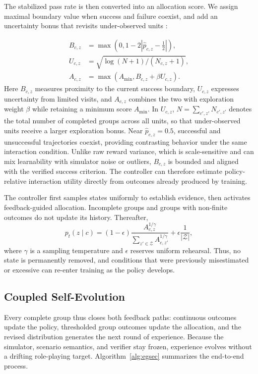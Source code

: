 \documentclass[letterpaper]{article}
\begin{document}
The stabilized pass rate is then converted into an allocation score. We assign maximal boundary value when success and failure coexist, and add an uncertainty bonus that revisits under-observed units \cite{auer2002ucb}:

\begin{equation}
\begin{aligned}
B_{c,z}&=\max(0,1-2|\hat p_{c,z}-\tfrac12|),\\
U_{c,z}&=\sqrt{\log(N+1)/(N_{c,z}+1)},\\
A_{c,z}&=\max(A_{\min},B_{c,z}+\beta U_{c,z}).
\end{aligned}
\label{eq:boundary}
\end{equation}
Here $B_{c,z}$ measures proximity to the current success boundary, $U_{c,z}$ expresses uncertainty from limited visits, and $A_{c,z}$ combines the two with exploration weight $\beta$ while retaining a minimum score $A_{\min}$. In $U_{c,z}$, $N=\sum_{c',z'}N_{c',z'}$ denotes the total number of completed groups across all units, so that under-observed units receive a larger exploration bonus. Near $\hat p_{c,z}=0.5$, successful and unsuccessful trajectories coexist, providing contrasting behavior under the same interaction condition. Unlike raw reward variance, which is scale-sensitive and can mix learnability with simulator noise or outliers, $B_{c,z}$ is bounded and aligned with the verified success criterion. The controller can therefore estimate policy-relative interaction utility directly from outcomes already produced by training.

The controller first samples states uniformly to establish evidence, then activates feedback-guided allocation. Incomplete groups and groups with non-finite outcomes do not update its history. Thereafter,
\begin{equation}
p_t(z\mid c)=(1-\epsilon)
\frac{A_{c,z}^{1/\gamma}}{\sum_{z'\in\mathcal Z}A_{c,z'}^{1/\gamma}}
+\epsilon\frac{1}{|\mathcal Z|},
\label{eq:sampling}
\end{equation}
where $\gamma$ is a sampling temperature and $\epsilon$ reserves uniform rehearsal. Thus, no state is permanently removed, and conditions that were previously misestimated or excessive can re-enter training as the policy develops.

\subsection{Coupled Self-Evolution}
Every complete group thus closes both feedback paths: continuous outcomes update the policy, thresholded group outcomes update the allocation, and the revised distribution generates the next round of experience. Because the simulator, scenario semantics, and verifier stay frozen, experience evolves without a drifting role-playing target. Algorithm~\ref{alg:egsec} summarizes the end-to-end process.
\end{document}
